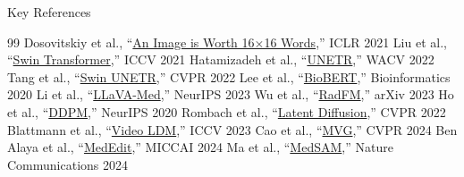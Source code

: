 \documentclass[aspectratio=169,xcolor=dvipsnames]{beamer}
\begin{document}
\begin{frame}[allowframebreaks]{Key References}
    \scriptsize
    \begin{thebibliography}{99}
         Dosovitskiy et al., ``\href{https://arxiv.org/abs/2010.11929}{An Image is Worth 16×16 Words},'' ICLR 2021
         Liu et al., ``\href{https://arxiv.org/abs/2103.14030}{Swin Transformer},'' ICCV 2021
         Hatamizadeh et al., ``\href{https://arxiv.org/abs/2103.10504}{UNETR},'' WACV 2022
         Tang et al., ``\href{https://arxiv.org/abs/2201.01266}{Swin UNETR},'' CVPR 2022
         Lee et al., ``\href{https://arxiv.org/abs/1901.08746}{BioBERT},'' Bioinformatics 2020
         Li et al., ``\href{https://arxiv.org/abs/2306.00890}{LLaVA-Med},'' NeurIPS 2023
         Wu et al., ``\href{https://arxiv.org/abs/2308.02463}{RadFM},'' arXiv 2023
         Ho et al., ``\href{https://arxiv.org/abs/2006.11239}{DDPM},'' NeurIPS 2020
         Rombach et al., ``\href{https://arxiv.org/abs/2112.10752}{Latent Diffusion},'' CVPR 2022
         Blattmann et al., ``\href{https://arxiv.org/abs/2304.08818}{Video LDM},'' ICCV 2023
         Cao et al., ``\href{https://openaccess.thecvf.com/content/CVPR2024/html/Cao_MVG_CVPR_2024_paper.html}{MVG},'' CVPR 2024
         Ben Alaya et al., ``\href{https://arxiv.org/abs/2407.15270}{MedEdit},'' MICCAI 2024
         Ma et al., ``\href{https://www.nature.com/articles/s41467-024-44824-z}{MedSAM},'' Nature Communications 2024
    \end{thebibliography}
\end{frame}
\end{document}
